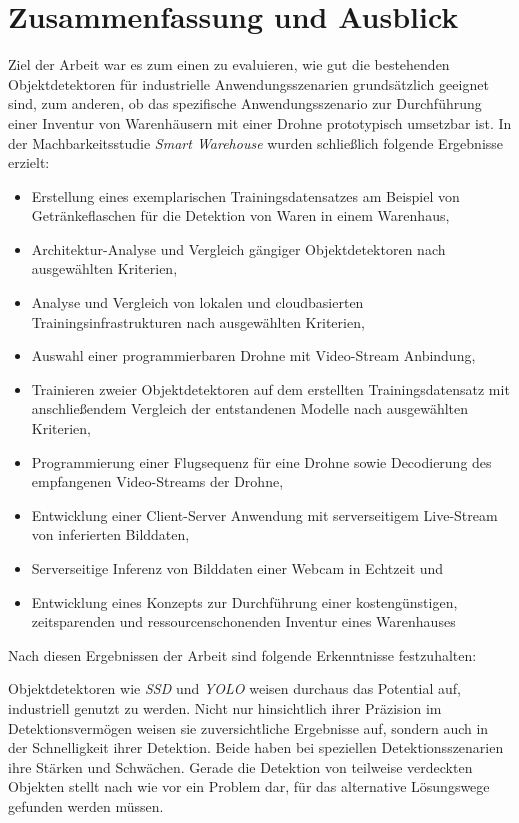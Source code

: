 \chapter{Zusammenfassung und Ausblick}

Ziel der Arbeit war es zum einen zu evaluieren, wie gut die bestehenden Objektdetektoren für industrielle Anwendungsszenarien grundsätzlich geeignet sind, zum anderen, ob das spezifische Anwendungsszenario zur Durchführung einer Inventur von Warenhäusern mit einer Drohne prototypisch umsetzbar ist. In der Machbarkeitsstudie \textit{Smart Warehouse} wurden schließlich folgende Ergebnisse erzielt:

\begin{itemize}
	\item Erstellung eines exemplarischen Trainingsdatensatzes am Beispiel von Getränkeflaschen für die Detektion von Waren in einem Warenhaus,
	\item Architektur-Analyse und Vergleich gängiger Objektdetektoren nach ausgewählten Kriterien,
	\item Analyse und Vergleich von lokalen und cloudbasierten Trainingsinfrastrukturen nach ausgewählten Kriterien,
	\item Auswahl einer programmierbaren Drohne mit Video-Stream Anbindung,
	\item Trainieren zweier Objektdetektoren auf dem erstellten Trainingsdatensatz mit anschließendem Vergleich der entstandenen Modelle nach ausgewählten Kriterien,
	\item Programmierung einer Flugsequenz für eine Drohne sowie Decodierung des empfangenen Video-Streams der Drohne,
	\item Entwicklung einer Client-Server Anwendung mit serverseitigem Live-Stream von inferierten Bilddaten,
	\item Serverseitige Inferenz von Bilddaten einer Webcam in Echtzeit und
	\item Entwicklung eines Konzepts zur Durchführung einer kostengünstigen, zeitsparenden und ressourcenschonenden Inventur eines Warenhauses
\end{itemize}

\newpage

Nach diesen Ergebnissen der Arbeit sind folgende Erkenntnisse festzuhalten:

Objektdetektoren wie \textit{SSD} und \textit{YOLO} weisen durchaus das Potential auf, industriell genutzt zu werden. Nicht nur hinsichtlich ihrer Präzision im Detektionsvermögen weisen sie zuversichtliche Ergebnisse auf, sondern auch in der Schnelligkeit ihrer Detektion. Beide haben bei speziellen Detektionsszenarien ihre Stärken und Schwächen. Gerade die Detektion von teilweise verdeckten Objekten stellt nach wie vor ein Problem dar, für das alternative Lösungswege gefunden werden müssen. 

